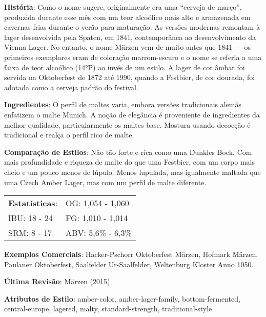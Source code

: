 \textbf{História}: Como o nome sugere, originalmente era uma “cerveja de março”, produzida durante esse mês com um teor alcoólico mais alto e armazenada em cavernas frias durante o verão para maturação. As versões modernas remontam à lager desenvolvida pela Spaten, em 1841, contemporânea ao desenvolvimento da Vienna Lager. No entanto, o nome Märzen vem de muito antes que 1841 — os primeiros exemplares eram de coloração marrom-escuro e o nome se referia a uma faixa de teor alcoólico (14°P) ao invés de um estilo. A lager de cor âmbar foi servida na Oktoberfest de 1872 até 1990, quando a Festbier, de cor dourada, foi adotada como a cerveja padrão do festival.

\textbf{Ingredientes}: O perfil de maltes varia, embora versões tradicionais alemãs enfatizem o malte Munich. A noção de elegância é proveniente de ingredientes da melhor qualidade, particularmente os maltes base. Mostura usando decocção é tradicional e realça o perfil rico de malte.

\textbf{Comparação de Estilos}: Não tão forte e rica como uma Dunkles Bock. Com mais profundidade e riqueza de malte do que uma Festbier, com um corpo mais cheio e um pouco menos de lúpulo. Menos lupulada, mas igualmente maltada que uma Czech Amber Lager, mas com um perfil de malte diferente.

\begin{tabular}{@{}p{35mm}p{35mm}@{}}
  \textbf{Estatísticas}: & OG: 1,054 - 1,060 \\
  IBU: 18 - 24  & FG: 1,010 - 1,014  \\
  SRM: 8 - 17  & ABV: 5,6\% - 6,3\%
\end{tabular}

\textbf{Exemplos Comerciais}: Hacker-Pschorr Oktoberfest Märzen, Hofmark Märzen, Paulaner Oktoberfest, Saalfelder Ur-Saalfelder, Weltenburg Kloster Anno 1050.

\textbf{Última Revisão}: Märzen (2015)

\textbf{Atributos de Estilo}: amber-color, amber-lager-family, bottom-fermented, central-europe, lagered, malty, standard-strength, traditional-style
